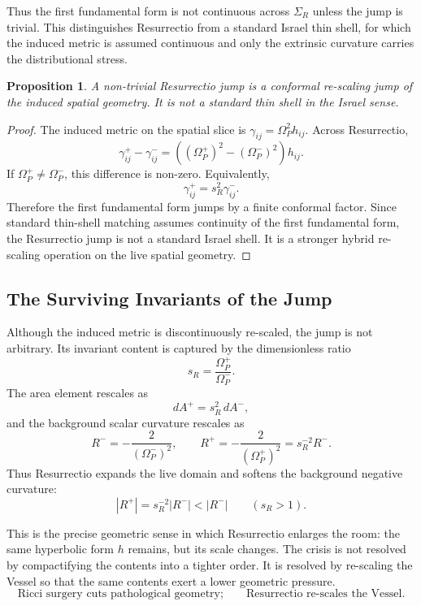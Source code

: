 \documentclass[11pt,a4paper,oneside]{book}
\theoremstyle{plain}
\newtheorem{proposition}{Proposition}[chapter]
\theoremstyle{definition}
\theoremstyle{remark}
\begin{document}
Thus the first fundamental form is not continuous across \(\Sigma_R\) unless
the jump is trivial. This distinguishes Resurrectio from a standard Israel
thin shell, for which the induced metric is assumed continuous and only the
extrinsic curvature carries the distributional stress.

\begin{proposition}
A non-trivial Resurrectio jump is a conformal re-scaling jump of the induced
spatial geometry. It is not a standard thin shell in the Israel sense.
\end{proposition}

\begin{proof}
The induced metric on the spatial slice is
\(\gamma_{ij}=\Omega_P^2h_{ij}\). Across Resurrectio,
\[
\gamma^+_{ij}-\gamma^-_{ij}
=
\left((\Omega_P^+)^2-(\Omega_P^-)^2\right)h_{ij}.
\]
If \(\Omega_P^+\neq\Omega_P^-\), this difference is non-zero. Equivalently,
\[
\gamma^+_{ij}=s_R^2\gamma^-_{ij}.
\]
Therefore the first fundamental form jumps by a finite conformal factor. Since
standard thin-shell matching assumes continuity of the first fundamental form,
the Resurrectio jump is not a standard Israel shell. It is a stronger hybrid
re-scaling operation on the live spatial geometry.
\end{proof}

\subsection{The Surviving Invariants of the Jump}

Although the induced metric is discontinuously re-scaled, the jump is not
arbitrary. Its invariant content is captured by the dimensionless ratio
\[
s_R=\frac{\Omega_P^+}{\Omega_P^-}.
\]
The area element rescales as
\[
dA^+=s_R^2\,dA^-,
\]
and the background scalar curvature rescales as
\[
R^-=-\frac{2}{(\Omega_P^-)^2},
\qquad
R^+=-\frac{2}{(\Omega_P^+)^2}
=
s_R^{-2}R^-.
\]
Thus Resurrectio expands the live domain and softens the background negative
curvature:
\[
|R^+|=s_R^{-2}|R^-|<|R^-|
\qquad
(s_R>1).
\]

This is the precise geometric sense in which Resurrectio enlarges the room:
the same hyperbolic form \(h\) remains, but its scale changes. The crisis is
not resolved by compactifying the contents into a tighter order. It is resolved
by re-scaling the Vessel so that the same contents exert a lower geometric
pressure.
\[
\boxed{
\text{Ricci surgery cuts pathological geometry;}
\qquad
\text{Resurrectio re-scales the Vessel.}
}
\]
\end{document}
